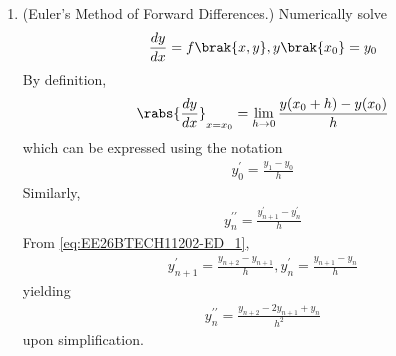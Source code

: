 \begin{enumerate}[label=\thesubsection.\arabic*, ref=\thesubsection.\theenumi]
\begin{align}
	    &=\frac{s\beta}{s^2 + \alpha^2}+\frac{\gamma}{s^2 + \alpha^2}
\end{align}
yielding
\begin{align}
	y(t)=\beta \cos(\alpha t) + \frac{\gamma}{\alpha}\sin(\alpha t) \label{eq:EE26BTECH11202-Laplace_7}
\end{align}
from \eqref{eq:EE26BTECH11202-Laplace_5}.
\item (Euler's Method of Forward Differences.)  Numerically solve 
\begin{align}
	\frac{dy}{dx}=f\brak{x,y}, y\brak{x_0}=y_0
\end{align}
\solution By definition,
\begin{align}
	\rabs{\frac{dy}{dx}}_{x = x_0}= \lim_{h \to 0}\frac{y(x_0+h)-y(x_0)}{h}
\end{align}
which can be expressed using the notation
\begin{align}
	y^{\prime}_0=\frac{y_{1}-y_0}{h} 
	\label{eq:EE26BTECH11202-ED_1}
\end{align}
Similarly,
\begin{align}
	y_n^{\prime \prime}=\frac{y_{n+1}^{\prime}-y_n^{\prime}}{h}
\end{align}
		From \eqref{eq:EE26BTECH11202-ED_1}, 
		\begin{align}
			y_{n+1}^{\prime}=\frac{y_{n+2}-y_{n+1}}{h}, y_n^{\prime}=\frac{y_{n+1}-y_n}{h}
		\end{align}
		yielding
\begin{align}
	y_n^{\prime \prime}=\frac{y_{n+2}-2y_{n+1}+y_n}{h^2} \label{eq:EE26BTECH11202-ED_2}
\end{align}
upon simplification.


\end{enumerate}
